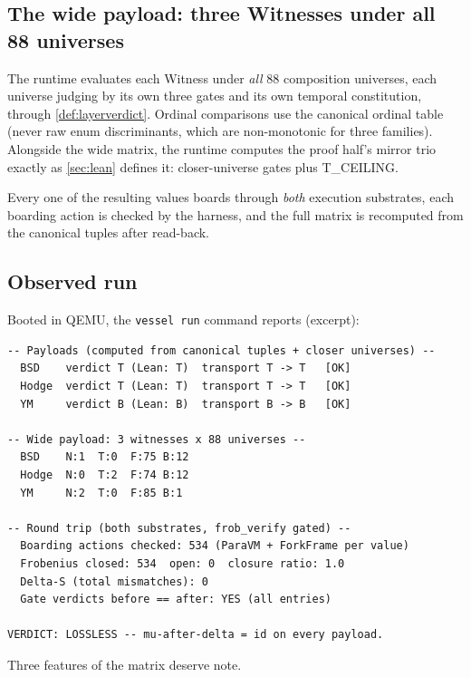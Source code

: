 \documentclass[12pt,a4paper]{article}
\begin{document}
\subsection{The wide payload: three Witnesses under all 88 universes}

The runtime evaluates each Witness under \emph{all} $88$ composition
universes, each universe judging by its own three gates and its own
temporal constitution, through \cref{def:layerverdict}. Ordinal
comparisons use the canonical ordinal table (never raw enum discriminants,
which are non-monotonic for three families). Alongside the wide matrix,
the runtime computes the proof half's mirror trio exactly as
\cref{sec:lean} defines it: closer-universe gates plus T\_CEILING.

Every one of the resulting values boards through \emph{both} execution
substrates, each boarding action is checked by the harness, and the full
matrix is recomputed from the canonical tuples after read-back.

\subsection{Observed run}

Booted in QEMU, the \texttt{vessel run} command reports (excerpt):

\begin{lstlisting}[caption={QEMU serial output (excerpt).}]
-- Payloads (computed from canonical tuples + closer universes) --
  BSD    verdict T (Lean: T)  transport T -> T   [OK]
  Hodge  verdict T (Lean: T)  transport T -> T   [OK]
  YM     verdict B (Lean: B)  transport B -> B   [OK]

-- Wide payload: 3 witnesses x 88 universes --
  BSD    N:1  T:0  F:75 B:12
  Hodge  N:0  T:2  F:74 B:12
  YM     N:2  T:0  F:85 B:1

-- Round trip (both substrates, frob_verify gated) --
  Boarding actions checked: 534 (ParaVM + ForkFrame per value)
  Frobenius closed: 534  open: 0  closure ratio: 1.0
  Delta-S (total mismatches): 0
  Gate verdicts before == after: YES (all entries)

VERDICT: LOSSLESS -- mu-after-delta = id on every payload.
\end{lstlisting}

Three features of the matrix deserve note.
\end{document}
